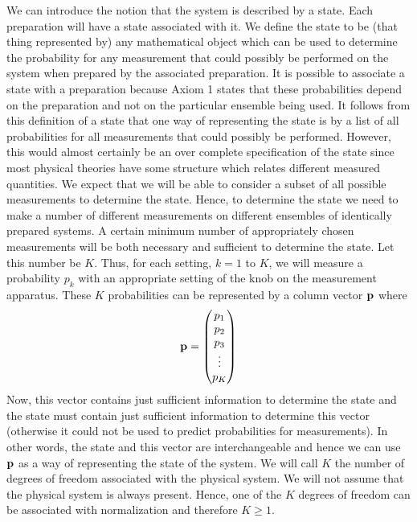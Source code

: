 \documentclass[10pt,twocolumn]{article}
\begin{document}
We can introduce the notion that the system is described by a state.
Each preparation will have a state associated with it. We
define the state to be (that thing represented by)
any mathematical object which can be used to
determine the probability for any measurement that could possibly be
performed on the system when prepared by the associated preparation. It
is possible to associate a state with a preparation because Axiom 1
states that these probabilities depend on the preparation and not on the
particular ensemble being used.  It follows from this definition of a
state that one way of representing the state is by a list of all
probabilities for all measurements that could possibly
be performed. However, this
would almost certainly be an over complete specification of the state
since most
physical theories have some structure which relates different measured
quantities. We expect that we will be able to consider a subset
of all possible measurements to determine the state.
Hence, to determine the state we need to make a number
of different measurements on
different ensembles of identically prepared systems.
A certain minimum number of appropriately chosen measurements will be
both necessary and sufficient to determine the state. Let this number be
$K$.  Thus, for each setting, $k=1$ to $K$, we will measure a
probability $p_k$ with an appropriate setting of the knob on the
measurement apparatus.
These $K$ probabilities can be represented by a column vector
${\bf p}$ where
\begin{equation}
  {\bf p} = \left(
  \begin{matrix} p_1 \\ p_2 \\ p_3 \\ \vdots \\ p_K \end{matrix} \right)
\end{equation}
Now, this vector contains just sufficient information to determine the state
and the state must contain just sufficient information to determine this
vector (otherwise it could not be used to predict probabilities for
measurements).  In other words, the state and this vector are
interchangeable and hence we can use ${\bf p}$ as a way of representing
the state of the system.
We will call $K$ the number of degrees of freedom associated with the
physical system.  We will not assume that the physical system is always
present.  Hence, one of the $K$ degrees of freedom can be associated
with normalization and therefore $K\geq 1$.
\end{document}
